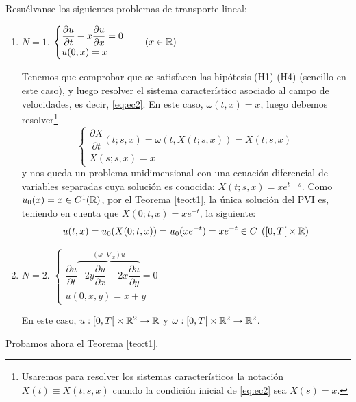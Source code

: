 \begin{ejercicio}
    Resuélvanse los siguientes problemas de transporte lineal:
    \begin{enumerate}
        \item[(i)] $N=1$. $\begin{cases}
            \dfrac{\partial u}{\partial t} + x \dfrac{\partial u}{\partial x} = 0 \\
            u(0,x) = x
        \end{cases} \quad (x \in \mathbb{R})$

        Tenemos que comprobar que se satisfacen las hipótesis (H1)-(H4) (sencillo en este caso), y luego resolver el sistema característico asociado al 
        campo de velocidades, es decir, \eqref{eq:ec2}. En este caso, $\omega(t,x) = x$, luego debemos resolver\footnote{Usaremos para resolver los sistemas característicos la notación $X(t) \equiv X(t;s,x)$ cuando la condición inicial de \eqref{eq:ec2} sea $X(s) = x$.}
        $$\begin{cases}
            \dfrac{\partial X}{\partial t}(t;s,x)
            =\omega(t,X(t;s,x)) = X(t;s,x)\\[6pt]
            X(s;s,x)=x
        \end{cases}$$
        y nos queda un problema unidimensional con una ecuación diferencial de variables separadas cuya solución es conocida: $X(t;s,x) = xe^{t-s}$. Como $u_0(x) = x \in C^1(\mathbb{R})$, 
        por el Teorema \ref{teo:t1}, la única solución del PVI es, teniendo en cuenta que $X(0;t,x) = xe^{-t}$, la siguiente:
        $$u(t,x) = u_0(X(0;t,x)) = u_0(xe^{-t}) = xe^{-t} \in C^1(\left[0, T \right[ \times \mathbb{R})$$
        \item[(ii)] $N=2$.
        $\begin{cases}
            \dfrac{\partial u}{\partial t} \overbrace{- 2y \dfrac{\partial u}{\partial x} + 2x \dfrac{\partial u}{\partial y}}^{(\omega \cdot \nabla_x) u} = 0 \\
            u(0,x,y) = x + y
        \end{cases}$

        En este caso, $u : \left[0, T \right[ \times \mathbb{R}^2 \to \mathbb{R}$ y $\omega : \left[0, T \right[ \times \mathbb{R}^2 \to \mathbb{R}^2$.

    \end{enumerate}
\end{ejercicio}

Probamos ahora el Teorema \ref{teo:t1}.

